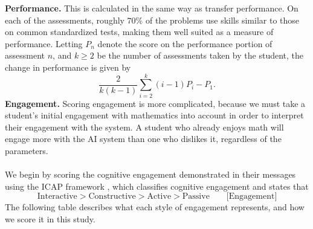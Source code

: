 \documentclass[12pt]{article}
\begin{document}
\textbf{Performance.} This is calculated in the same way as transfer performance. On each of the assessments, roughly $70\%$ of the problems use skills similar to those on common standardized tests, making them well suited as a measure of performance. Letting $P_n$ denote the score on the performance portion of assessment $n$, and $k \ge 2$ be the number of assessments taken by the student, the change in performance is given by
\[\frac{2}{k(k-1)} \sum_{i=2}^{k} (i-1)P_i - P_1.\]
\textbf{Engagement.} Scoring engagement is more complicated, because we must take a student's initial engagement with mathematics into account in order to interpret their engagement with the system. A student who already enjoys math will engage more with the AI system than one who dislikes it, regardless of the parameters.
\\\\
We begin by scoring the cognitive engagement demonstrated in their messages using the ICAP framework \cite{Chi02102014}, which classifies cognitive engagement and states that
\[\text{Interactive}>\text{Constructive} > \text{Active} > \text{Passive} \qquad \text{[Engagement]}\] The following table describes what each style of engagement represents, and how we score it in this study.
\end{document}
